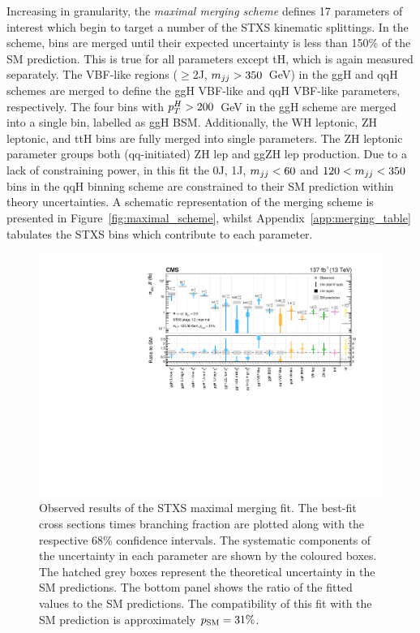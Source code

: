 Increasing in granularity, the \textit{maximal merging scheme} defines 17 parameters of interest which begin to target a number of the STXS kinematic splittings. In the scheme, bins are merged until their expected uncertainty is less than 150\% of the SM prediction. This is true for all parameters except tH, which is again measured separately. The VBF-like regions ($\geq$2J, $m_{jj}>350$~GeV) in the ggH and qqH schemes are merged to define the ggH VBF-like and qqH VBF-like parameters, respectively. The four bins with $p_T^H>200$~GeV in the ggH scheme are merged into a single bin, labelled as ggH BSM. Additionally, the WH leptonic, ZH leptonic, and ttH bins are fully merged into single parameters. The ZH leptonic parameter groups both (qq-initiated) ZH lep and ggZH lep production. Due to a lack of constraining power, in this fit the 0J, 1J, $m_{jj}<60$ and $120<m_{jj}<350$ bins in the qqH binning scheme are constrained to their SM prediction within theory uncertainties. A schematic representation of the merging scheme is presented in Figure~\ref{fig:maximal_scheme}, whilst Appendix~\ref{app:merging_table} tabulates the STXS bins which contribute to each parameter.


\begin{figure}[htb!]
  \centering
  \includegraphics[width=1\textwidth]{Figures/hgg_results/stage1p2_maximal_summary.pdf}
  \caption[Results of the maximal merging fit]
  {
    Observed results of the STXS maximal merging fit. The best-fit cross sections times branching fraction are plotted along with the respective 68\% confidence intervals. The systematic components of the uncertainty in each parameter are shown by the coloured boxes. The hatched grey boxes represent the theoretical uncertainty in the SM predictions. The bottom panel shows the ratio of the fitted values to the SM predictions. The compatibility of this fit with the SM prediction is approximately $p_{\rm{SM}}=31\%$. 
  }
  \label{fig:stage1p2_maximal_results}
\end{figure}

